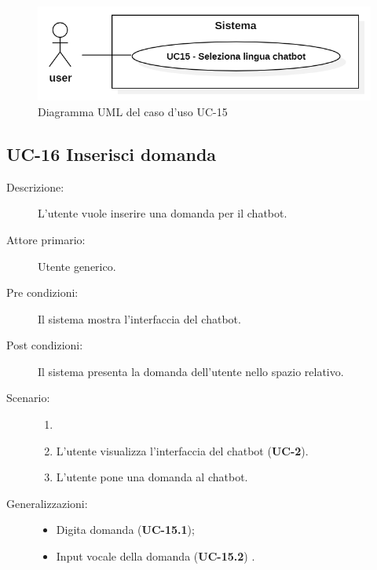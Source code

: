 \begin{figure}[H]
    \centering
    \includegraphics[width=0.8\linewidth]{UC15.png}
    \caption{Diagramma UML del caso d'uso UC-15}
    \label{fig:UC15}
\end{figure}

\subsection{UC-16 Inserisci domanda}
\begin{description}
    \item[Descrizione:] L'utente vuole inserire una domanda per il chatbot.
    \item[Attore primario:] Utente generico.
    \item[Pre condizioni:] Il sistema mostra l'interfaccia del chatbot.
    \item[Post condizioni:] Il sistema presenta la domanda dell'utente nello spazio relativo.
    \item[Scenario:]
    \begin{enumerate}
        \item[] 
        \item L’utente visualizza l'interfaccia del chatbot (\textbf{UC-2}).
        \item L’utente pone una domanda al chatbot.
    \end{enumerate}
    \item[Generalizzazioni:] 
    \begin{itemize}
        \item Digita domanda (\textbf{UC-15.1});
        \item Input vocale della domanda (\textbf{UC-15.2}) .
    \end{itemize}
\end{description}

